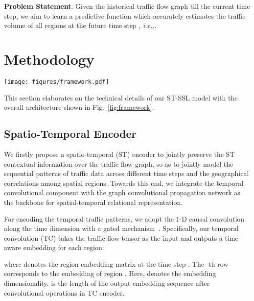 \documentclass[letterpaper]{article} \usepackage{aaai23}  \usepackage{times}  \usepackage{helvet}  \usepackage{courier}  \usepackage[hyphens]{url}  \usepackage{graphicx} \urlstyle{rm} \def\UrlFont{\rm}  \usepackage{natbib}  \usepackage{caption} \frenchspacing  \setlength{\pdfpagewidth}{8.5in} \setlength{\pdfpageheight}{11in}
\newcommand{\ie}{\emph{i.e.,}\xspace}
\newcommand{\name}{ST-SSL\xspace}
\newcommand{\figureautorefname}{Fig.}
\begin{document}
\noindent \textbf{Problem Statement}. Given the historical traffic flow graph  till the current time step, we aim to learn a predictive function which accurately estimates the traffic volume of all regions at the future time step , \ie .

\section{Methodology}\label{sec:method}

\begin{figure*}[t]
    \centering
    \texttt{[image: figures/framework.pdf]}
    \vspace{-0.2cm}
    \caption{(a): The overall architecture of \name. (b): Spatial heterogeneity modeling. (c): Temporal heterogeneity modeling.}
    \vspace{-0.4cm}
    \label{fig:framework}
\end{figure*}




This section elaborates on the technical details of our \name model with the overall architecture shown in \figureautorefname~\ref{fig:framework}.

\subsection{Spatio-Temporal Encoder}

We firstly propose a spatio-temporal (ST) encoder to jointly preserve the ST contextual information over the traffic flow graph, so as to jointly model the sequential patterns of traffic data across different time steps and the geographical correlations among spatial regions. Towards this end, we integrate the temporal convolutional component with the graph convolutional propagation network as the backbone for spatial-temporal relational representation.



For encoding the temporal traffic patterns, we adopt the 1-D causal convolution along the time dimension with a gated mechanism~\cite{yu2018spatio}. Specifically, our temporal convolution (TC) takes the traffic flow tensor as the input and outputs a time-aware embedding for each region:

\noindent where  denotes the region embedding matrix at the time step . The -th row  corresponds to the embedding of region . Here,  denotes the embedding dimensionality.  is the length of the output embedding sequence after convolutional operations in TC encoder.
\end{document}
